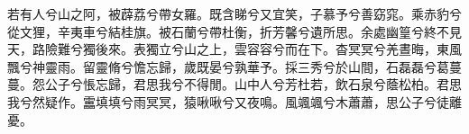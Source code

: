 
\begin{pinyinscope}
若有人兮山之阿，被薜荔兮帶女羅。既含睇兮又宜笑，子慕予兮善窈窕。乘赤豹兮從文狸，辛夷車兮結桂旗。被石蘭兮帶杜衡，折芳馨兮遺所思。余處幽篁兮終不見天，路險難兮獨後來。表獨立兮山之上，雲容容兮而在下。杳冥冥兮羌晝晦，東風飄兮神靈雨。留靈脩兮憺忘歸，歲既晏兮孰華予。採三秀兮於山間，石磊磊兮葛蔓蔓。怨公子兮悵忘歸，君思我兮不得閒。山中人兮芳杜若，飲石泉兮蔭松柏。君思我兮然疑作。靁填填兮雨冥冥，猿啾啾兮又夜鳴。風颯颯兮木蕭蕭，思公子兮徒離憂。


\end{pinyinscope}